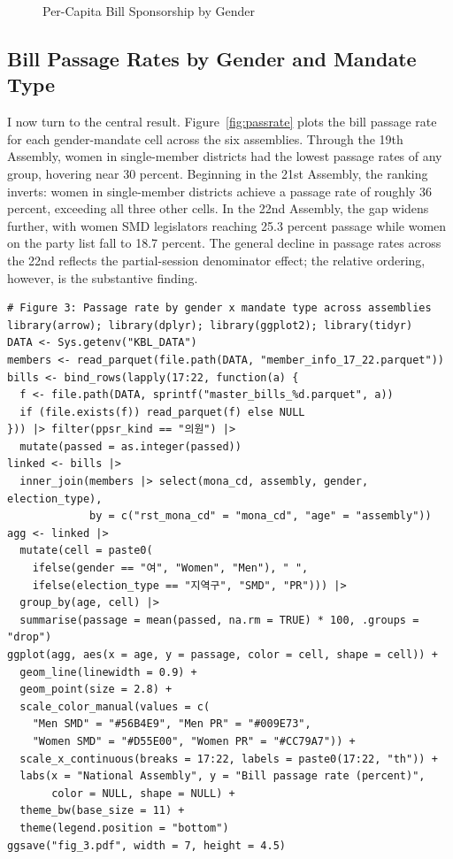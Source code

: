 \documentclass[11pt]{article}
\begin{document}
\begin{figure}[H]
\centering
{}
\caption{Per-Capita Bill Sponsorship by Gender}
\label{fig:percapita}
\end{figure}

\subsection{Bill Passage Rates by Gender and Mandate Type}

I now turn to the central result. Figure~\ref{fig:passrate} plots the bill passage rate for each gender-mandate cell across the six assemblies. Through the 19th Assembly, women in single-member districts had the lowest passage rates of any group, hovering near 30 percent. Beginning in the 21st Assembly, the ranking inverts: women in single-member districts achieve a passage rate of roughly 36 percent, exceeding all three other cells. In the 22nd Assembly, the gap widens further, with women SMD legislators reaching 25.3 percent passage while women on the party list fall to 18.7 percent. The general decline in passage rates across the 22nd reflects the partial-session denominator effect; the relative ordering, however, is the substantive finding.

\begin{verbatim}
# Figure 3: Passage rate by gender x mandate type across assemblies
library(arrow); library(dplyr); library(ggplot2); library(tidyr)
DATA <- Sys.getenv("KBL_DATA")
members <- read_parquet(file.path(DATA, "member_info_17_22.parquet"))
bills <- bind_rows(lapply(17:22, function(a) {
  f <- file.path(DATA, sprintf("master_bills_%d.parquet", a))
  if (file.exists(f)) read_parquet(f) else NULL
})) |> filter(ppsr_kind == "의원") |>
  mutate(passed = as.integer(passed))
linked <- bills |>
  inner_join(members |> select(mona_cd, assembly, gender, election_type),
             by = c("rst_mona_cd" = "mona_cd", "age" = "assembly"))
agg <- linked |>
  mutate(cell = paste0(
    ifelse(gender == "여", "Women", "Men"), " ",
    ifelse(election_type == "지역구", "SMD", "PR"))) |>
  group_by(age, cell) |>
  summarise(passage = mean(passed, na.rm = TRUE) * 100, .groups = "drop")
ggplot(agg, aes(x = age, y = passage, color = cell, shape = cell)) +
  geom_line(linewidth = 0.9) +
  geom_point(size = 2.8) +
  scale_color_manual(values = c(
    "Men SMD" = "#56B4E9", "Men PR" = "#009E73",
    "Women SMD" = "#D55E00", "Women PR" = "#CC79A7")) +
  scale_x_continuous(breaks = 17:22, labels = paste0(17:22, "th")) +
  labs(x = "National Assembly", y = "Bill passage rate (percent)",
       color = NULL, shape = NULL) +
  theme_bw(base_size = 11) +
  theme(legend.position = "bottom")
ggsave("fig_3.pdf", width = 7, height = 4.5)
\end{verbatim}
\end{document}
